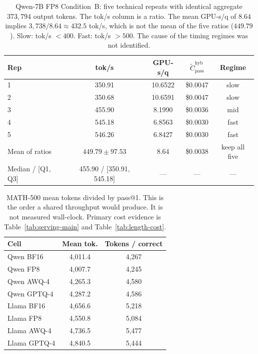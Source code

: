 \documentclass[11pt,a4paper]{article}
\begin{document}
\begin{table}[t]
\centering
\caption{Qwen-7B FP8 Condition~B: five technical repeats with identical aggregate $373{,}794$ output tokens. The tok/s column is a ratio. The mean GPU-s/q of $8.64$ implies $3{,}738/8.64 \approx 432.5$ tok/s, which is not the mean of the five ratios ($449.79$). Slow: tok/s $<400$. Fast: tok/s $>500$. The cause of the timing regimes was not identified.}
\label{tab:fp8-reps}
\small
\begin{tabular}{lcccc}
\toprule
\textbf{Rep} & \textbf{tok/s} & \textbf{GPU-s/q} & \textbf{$\widetilde{C}_{\mathrm{pass}}^{\mathrm{hyb}}$} & \textbf{Regime} \\
\midrule
1 & 350.91 & 10.6522 & \$0.0047 & slow \\
2 & 350.68 & 10.6591 & \$0.0047 & slow \\
3 & 455.90 & 8.1990 & \$0.0036 & mid \\
4 & 545.18 & 6.8563 & \$0.0030 & fast \\
5 & 546.26 & 6.8427 & \$0.0030 & fast \\
\midrule
Mean of ratios & $449.79\pm 97.53$ & 8.64 & \$0.0038 & keep all five \\
Median / [Q1, Q3] & 455.90 / [350.91, 545.18] & --- & --- & --- \\
\bottomrule
\end{tabular}
\end{table}

\begin{table}[t]
\centering
\caption{MATH-500 mean tokens divided by pass@1. This is the order a shared throughput would produce. It is not measured wall-clock. Primary cost evidence is Table~\ref{tab:serving-main} and Table~\ref{tab:length-cost}.}
\label{tab:economics}
\small
\begin{tabular}{lcc}
\toprule
\textbf{Cell} & \textbf{Mean tok.} & \textbf{Tokens / correct} \\
\midrule
Qwen BF16   & 4{,}011.4 & 4{,}267 \\
Qwen FP8    & 4{,}007.7 & 4{,}245 \\
Qwen AWQ-4  & 4{,}265.3 & 4{,}580 \\
Qwen GPTQ-4 & 4{,}287.2 & 4{,}586 \\
\midrule
Llama BF16   & 4{,}656.6 & 5{,}218 \\
Llama FP8    & 4{,}550.8 & 5{,}084 \\
Llama AWQ-4  & 4{,}736.5 & 5{,}477 \\
Llama GPTQ-4 & 4{,}840.5 & 5{,}444 \\
\bottomrule
\end{tabular}
\end{table}
\end{document}
